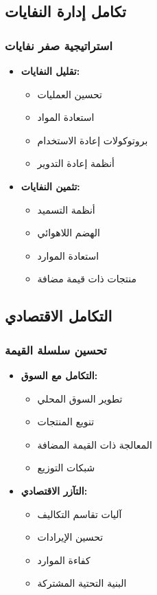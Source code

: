 \subsection{تكامل إدارة النفايات}

\subsubsection{استراتيجية صفر نفايات}
\begin{itemize}
    \item \textbf{تقليل النفايات:}
    \begin{itemize}
        \item تحسين العمليات
        \item استعادة المواد
        \item بروتوكولات إعادة الاستخدام
        \item أنظمة إعادة التدوير
    \end{itemize}
    
    \item \textbf{تثمين النفايات:}
    \begin{itemize}
        \item أنظمة التسميد
        \item الهضم اللاهوائي
        \item استعادة الموارد
        \item منتجات ذات قيمة مضافة
    \end{itemize}
\end{itemize}

\subsection{التكامل الاقتصادي}

\subsubsection{تحسين سلسلة القيمة}
\begin{itemize}
    \item \textbf{التكامل مع السوق:}
    \begin{itemize}
        \item تطوير السوق المحلي
        \item تنويع المنتجات
        \item المعالجة ذات القيمة المضافة
        \item شبكات التوزيع
    \end{itemize}
    
    \item \textbf{التآزر الاقتصادي:}
    \begin{itemize}
        \item آليات تقاسم التكاليف
        \item تحسين الإيرادات
        \item كفاءة الموارد
        \item البنية التحتية المشتركة
    \end{itemize}
\end{itemize}

